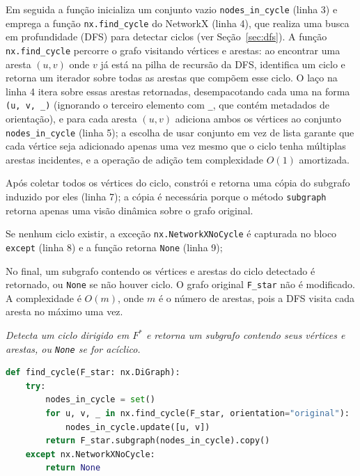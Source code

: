 Em seguida a função inicializa um conjunto vazio \texttt{nodes\_in\_cycle} (linha 3) e emprega a função \texttt{nx.find\_cycle} do NetworkX (linha 4), que realiza uma busca em profundidade (DFS) para detectar ciclos (ver Seção~\ref{sec:dfs}). A função \texttt{nx.find\_cycle} percorre o grafo visitando vértices e arestas: ao encontrar uma aresta \((u,v)\) onde \(v\) já está na pilha de recursão da DFS, identifica um ciclo e retorna um iterador sobre todas as arestas que compõem esse ciclo. O laço na linha 4 itera sobre essas arestas retornadas, desempacotando cada uma na forma \texttt{(u, v, \_)} (ignorando o terceiro elemento com \texttt{\_}, que contém metadados de orientação), e para cada aresta \((u,v)\) adiciona ambos os vértices ao conjunto \texttt{nodes\_in\_cycle} (linha 5); a escolha de usar conjunto em vez de lista garante que cada vértice seja adicionado apenas uma vez mesmo que o ciclo tenha múltiplas arestas incidentes, e a operação de adição tem complexidade \(O(1)\) amortizada.

Após coletar todos os vértices do ciclo, constrói e retorna uma cópia do subgrafo induzido por eles (linha 7); a cópia é necessária porque o método \texttt{subgraph} retorna apenas uma visão dinâmica sobre o grafo original.

Se nenhum ciclo existir, a exceção \texttt{nx.NetworkXNoCycle} é capturada no bloco \texttt{except} (linha 8) e a função retorna \texttt{None} (linha 9);

No final, um subgrafo contendo os vértices e arestas do ciclo detectado é retornado, ou \texttt{None} se não houver ciclo. O grafo original \texttt{F\_star} não é modificado. A complexidade é \(O(m)\), onde \(m\) é o número de arestas, pois a DFS visita cada aresta no máximo uma vez.

\begin{tcolorbox}[
        enhanced, breakable,
        colframe=blue!60!black, colback=blue!2,
        colbacktitle=blue!15, coltitle=black,
        title={Detecção de ciclo dirigido em $F^*$},
        boxed title style={sharp corners, boxrule=0.6pt},
        sharp corners, boxrule=0.6pt
    ]
    \emph{Detecta um ciclo dirigido em $F^*$ e retorna um subgrafo contendo seus vértices e arestas, ou \texttt{None} se for acíclico.}
    \tcblower
    \begin{lstlisting}[mathescape=true, language=Python]
def find_cycle(F_star: nx.DiGraph):
    try:
        nodes_in_cycle = set()
        for u, v, _ in nx.find_cycle(F_star, orientation="original"):
            nodes_in_cycle.update([u, v])
        return F_star.subgraph(nodes_in_cycle).copy()
    except nx.NetworkXNoCycle:
        return None  
\end{lstlisting}
\end{tcolorbox}

